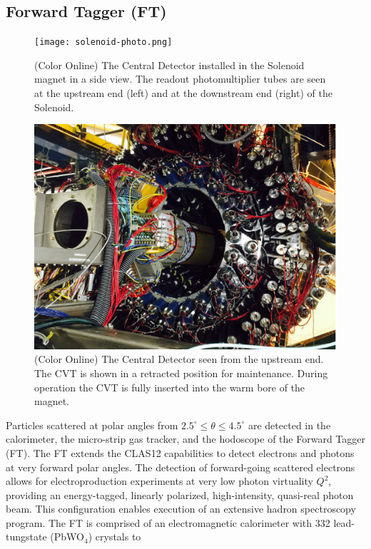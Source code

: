 \documentclass[final,3p,twocolumn]{elsarticle}
\begin{document}
\subsection{Forward Tagger (FT)}
\begin{figure}[htbp!]
\centerline{\texttt{[image: solenoid-photo.png]}}
\caption{(Color Online) The Central Detector installed in the Solenoid magnet in a side view. The readout photomultiplier tubes are
seen at the upstream end (left) and at the downstream end (right) of the Solenoid.}
\label{CDinSol}
\end{figure}


\begin{figure}[htbp!]
\centerline{\includegraphics[width=1.3\columnwidth,angle=90]{CLAS12-CD.png}}
\caption{(Color Online) The Central Detector seen from the upstream end. The CVT is shown in a retracted position for
maintenance. During operation the CVT is fully inserted into the warm bore of the magnet.}
\label{CDback}
\end{figure}
Particles scattered at polar angles from $2.5^\circ \le \theta \le 4.5^\circ $ are detected in the calorimeter, the
micro-strip gas tracker, and the hodoscope of the Forward Tagger (FT). The FT extends the CLAS12 capabilities to
detect electrons and photons at very forward polar angles. The detection of forward-going scattered electrons allows
for electroproduction experiments at very low photon virtuality $Q^2$, providing an energy-tagged, linearly polarized,
high-intensity, quasi-real photon beam. This configuration enables execution of an extensive hadron spectroscopy
program. The FT is comprised of an electromagnetic calorimeter with 332 lead-tungstate (PbWO$_4$) crystals to
\end{document}

